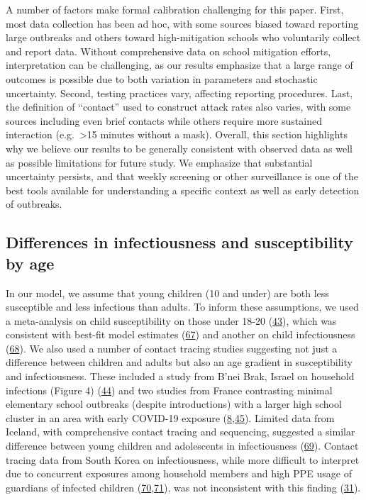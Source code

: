 \documentclass[
]{article}
\begin{document}
A number of factors make formal calibration challenging for this paper.
First, most data collection has been ad hoc, with some sources biased
toward reporting large outbreaks and others toward high-mitigation
schools who voluntarily collect and report data. Without comprehensive
data on school mitigation efforts, interpretation can be challenging, as
our results emphasize that a large range of outcomes is possible due to
both variation in parameters and stochastic uncertainty. Second, testing
practices vary, affecting reporting procedures. Last, the definition of
``contact'' used to construct attack rates also varies, with some
sources including even brief contacts while others require more
sustained interaction (e.g.~\textgreater15 minutes without a mask).
Overall, this section highlights why we believe our results to be
generally consistent with observed data as well as possible limitations
for future study. We emphasize that substantial uncertainty persists,
and that weekly screening or other surveillance is one of the best tools
available for understanding a specific context as well as early
detection of outbreaks.

\hypertarget{differences-in-infectiousness-and-susceptibility-by-age}{%
\subsection{Differences in infectiousness and susceptibility by
age}\label{differences-in-infectiousness-and-susceptibility-by-age}}

In our model, we assume that young children (10 and under) are both less
susceptible and less infectious than adults. To inform these
assumptions, we used a meta-analysis on child susceptibility on those
under 18-20 (\protect\hyperlink{ref-viner_susceptibility_2020}{43}),
which was consistent with best-fit model estimates
(\protect\hyperlink{ref-davies_age-dependent_2020}{67}) and another on
child infectiousness
(\protect\hyperlink{ref-zhu_meta-analysis_2020}{68}). We also used a
number of contact tracing studies suggesting not just a difference
between children and adults but also an age gradient in susceptibility
and infectiousness. These included a study from B'nei Brak, Israel on
household infections (Figure 4)
(\protect\hyperlink{ref-dattner_role_2020}{44}) and two studies from
France contrasting minimal elementary school outbreaks (despite
introductions) with a larger high school cluster in an area with early
COVID-19 exposure
(\protect\hyperlink{ref-fontanet_sars-cov-2_2020}{8},\protect\hyperlink{ref-fontanet_cluster_2020}{45}).
Limited data from Iceland, with comprehensive contact tracing and
sequencing, suggested a similar difference between young children and
adolescents in infectiousness
(\protect\hyperlink{ref-noauthor_exclusive_2020}{69}). Contact tracing
data from South Korea on infectiousness, while more difficult to
interpret due to concurrent exposures among household members and high
PPE usage of guardians of infected children
(\protect\hyperlink{ref-kim_role_2020}{70},\protect\hyperlink{ref-lee_absence_nodate}{71}),
was not inconsistent with this finding
(\protect\hyperlink{ref-park_early_nodate}{31}).
\end{document}
